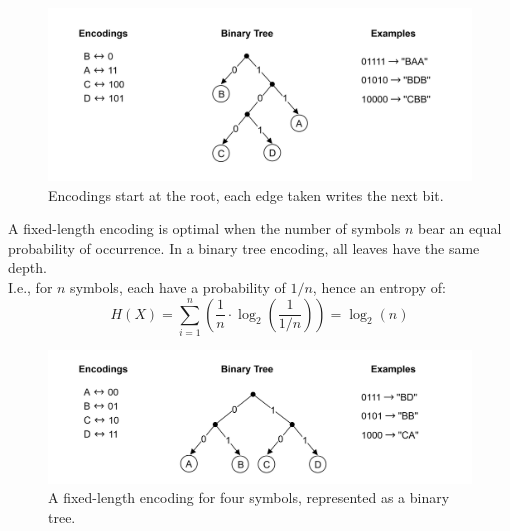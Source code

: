 \begin{figure}[ht!]

    \centering
    \includegraphics[width=\textwidth]{./Sections/comp/info/binary_tree_encoding.png}
    \caption{Encodings start at the root, each edge taken writes the next bit.}

    \label{fig:binary_tree_encoding}
\end{figure}

\newpage 
\noindent

\begin{theo}

    \label{theo:fixed_length_encoding}

    \noindent
    A fixed-length encoding is optimal when the number of symbols $n$ bear an equal probability of occurrence. 
    In a binary tree encoding, all leaves have the same depth.\\

    \noindent
    I.e., for $n$ symbols, each have a probability of $1/n$, hence an entropy of:
    \[
    H(X) = \sum_{i=1}^{n} \left(\dfrac{1}{n} \cdot \log_2\left(\dfrac{1}{1/n}\right)\right) = \log_2(n)
    \]
\end{theo}

\begin{figure}[ht!]

    \centering
    \includegraphics[width=\textwidth]{./Sections/comp/info/bt_fixed.png}
    \caption{A fixed-length encoding for four symbols, represented as a binary tree.}

    \label{fig:fixed_length_encoding}
\end{figure}

